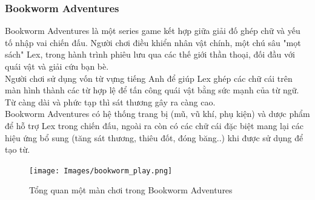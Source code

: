 \subsubsection{Bookworm Adventures}
\hspace*{1cm} Bookworm Adventures là một series game kết hợp giữa giải đố ghép chữ và yếu tố nhập vai chiến đấu. Người chơi điều khiển nhân vật chính, một chú sâu "mọt sách" Lex, trong hành trình phiêu lưu qua các thế giới thần thoại, đối đầu với quái vật và giải cứu bạn bè.\\
\hspace*{1cm} Người chơi sử dụng vốn từ vựng tiếng Anh để giúp Lex ghép các chữ cái trên màn hình thành các từ hợp lệ để tấn công quái vật bằng sức mạnh của từ ngữ. Từ càng dài và phức tạp thì sát thương gây ra càng cao.\\
\hspace*{1cm} Bookworm Adventures có hệ thống trang bị (mũ, vũ khí, phụ kiện) và dược phẩm để hỗ trợ Lex trong chiến đấu, ngoài ra còn có các chữ cái đặc biệt mang lại các hiệu ứng bổ sung (tăng sát thương, thiêu đốt, đóng băng..) khi được sử dụng để tạo từ.
\begin{figure}[H]
	\centering
	\texttt{[image: Images/bookworm\_play.png]}
	\vspace{0.5cm}
	\caption{Tổng quan một màn chơi trong Bookworm Adventures}
\end{figure}
